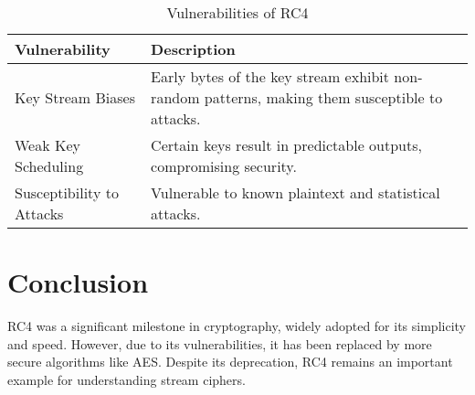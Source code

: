 \documentclass[11pt]{article}
\begin{document}
\begin{table}[h!]
\centering
\begin{tabular}{|p{4cm}|p{8cm}|}
\hline
\textbf{Vulnerability}      & \textbf{Description} \\ \hline
Key Stream Biases           & Early bytes of the key stream exhibit non-random patterns, making them susceptible to attacks. \\ \hline
Weak Key Scheduling         & Certain keys result in predictable outputs, compromising security. \\ \hline
Susceptibility to Attacks   & Vulnerable to known plaintext and statistical attacks. \\ \hline
\end{tabular}
\caption{Vulnerabilities of RC4}
\end{table}

\section{Conclusion}
RC4 was a significant milestone in cryptography, widely adopted for its simplicity and speed. However, due to its vulnerabilities, it has been replaced by more secure algorithms like AES. Despite its deprecation, RC4 remains an important example for understanding stream ciphers.
\end{document}
